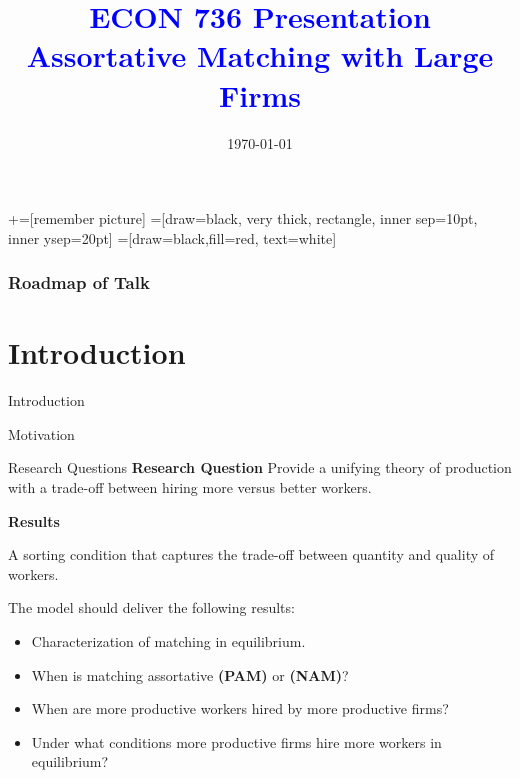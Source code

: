 \documentclass[notes,11pt, aspectratio=169]{beamer}
\title[]{\textcolor{blue}{ECON 736 Presentation \\ Assortative Matching with Large Firms}}
\author[MVB]{}
\institute[UW-Madison]{Mitchell Valdes-Bobes}
\date{\today}
\newenvironment{wideitemize}{\itemize\addtolength{\itemsep}{10pt}}{\enditemize}
\begin{document}
\newcommand\marktopleft[1]{%
    \tikz[overlay,remember picture] 
        \node (marker-#1-a) at (-.3em,.3em) {};%
}
\newcommand\markbottomright[2]{%
    \tikz[overlay,remember picture] 
        \node (marker-#1-b) at (0em,0em) {};%
}
+=[remember picture] 
 =[draw=black, very thick, rectangle, inner sep=10pt, inner ysep=20pt]
 =[draw=black,fill=red, text=white]

\begin{frame}
	\maketitle
\end{frame}
\begin{frame}
	\frametitle{Roadmap of Talk}
	\tableofcontents
\end{frame}

\section{Introduction}
\begin{frame}{Introduction}
\end{frame}

\begin{frame}{Motivation}
\end{frame}

\begin{frame}{Research Questions}
	\textbf{Research Question}
Provide a unifying theory of production with a trade-off between hiring more versus better workers.

\textbf{Results}
\begin{wideitemize}
    \item  A sorting condition that captures the trade-off between quantity and quality of workers. 
\end{wideitemize}

The model should deliver the following results:
\begin{itemize}
    \item Characterization of matching in equilibrium.
    \begin{wideitemize}
        \item When is matching assortative \textbf{(PAM)} or \textbf{(NAM)}?
        \begin{wideitemize}
            \item When are more productive workers hired by more productive firms?
        \end{wideitemize}
        \item Under what conditions more productive firms hire more workers in equilibrium?
    \end{wideitemize}
\end{itemize}

\end{frame}
\end{document}
